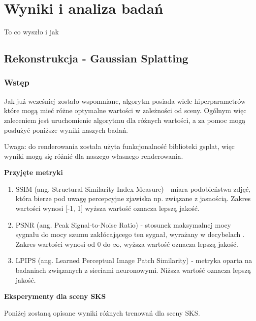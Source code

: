 \section{Wyniki i analiza badań}
To co wyszło i jak

\subsection{Rekonstrukcja - Gaussian Splatting}

\subsubsection{Wstęp}
Jak już wcześniej zostało wspomniane, algorytm posiada wiele hiperparametrów które mogą mieć różne optymalne wartości w zależności od sceny. Ogólnym więc zaleceniem jest uruchomienie algorytmu dla różnych wartości, a za pomoc mogą posłużyć poniższe wyniki naszych badań. 

Uwaga: do renderowania została użyta funkcjonalność biblioteki gsplat, więc wyniki mogą się różnić dla naszego własnego renderowania. 

\textbf{Przyjęte metryki}
\begin{enumerate}
    \item SSIM (ang. Structural Similarity Index Measure) - miara podobieństwa zdjęć, która bierze pod uwagę percepcyjne zjawiska np. związane z jasnością. Zakres wartości wynosi [-1, 1] wyższa wartość oznacza lepszą jakość. 
    \item PSNR (ang. Peak Signal-to-Noise Ratio) - stosunek maksymalnej mocy sygnału do mocy szumu zakłócającego ten sygnał, wyrażany w decybelach . Zakres wartości wynosi od 0 do $\infty$, wyższa wartość oznacza lepszą jakość. 
    \item LPIPS (ang. Learned Perceptual Image Patch Similarity) - metryka oparta na badaniach związanych z sieciami neuronowymi. Niższa wartość oznacza lepszą jakość. 
\end{enumerate}

\textbf{Eksperymenty dla sceny SKS}

Poniżej zostaną opisane wyniki różnych trenowań dla sceny SKS. 

